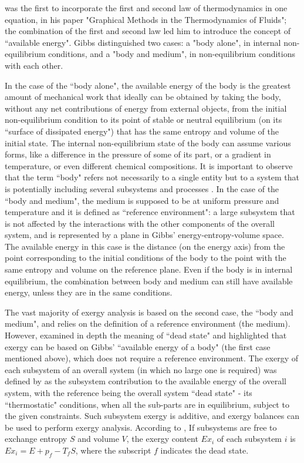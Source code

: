 \documentclass[10pt]{extarticle} %
\begin{document}
\cite{Gibbs1873} was the first to incorporate the first and second law of thermodynamics in one equation, in his paper "Graphical Methods in the Thermodyna\-mics of Fluids"; the combination of the first and second law led him to introduce the concept of ``available energy". Gibbs distinguished two cases: a "body alone", in internal non-equilibrium conditions, and a "body and medium", in non-equilibrium conditions with each other. 

In the case of the ``body alone", the available energy of the body is the greatest amount of mechanical work that ideally can be obtained by taking the body, without any net contributions of energy from external objects, from the initial non-equilibrium condition to its point of stable or neutral equilibrium (on its ``surface of dissipated energy") that has the same entropy and volume of the initial state. The internal non-equilibrium state of the body can assume various forms, like a difference in the pressure of some of its part, or a gradient in temperature, or even different chemical compositions. It is important to observe that the term ``body" refers not necessarily to a single entity but to a system that is potentially including several subsystems and processes \citep{Gaggioli2012}.
In the case of the ``body and medium", the medium is supposed to be at uniform pressure and temperature and it is defined as ``reference environment": a large subsystem that is not affected by the interactions with the other components of the overall system, and is represented by a plane in Gibbs' energy-entropy-volume space. The available energy in this case is the distance (on the energy axis) from the point corresponding to the initial conditions of the body to the point with the same entropy and volume on the reference plane. Even if the body is in internal equilibrium, the combination between body and medium can still have available energy, unless they are in the same conditions. 


The vast majority of exergy analysis is based on the second case, the  ``body and medium", and relies on the definition of a reference environment (the medium). However, \cite{Gaggioli2012} examined in depth the meaning of ``dead state" and highlighted that exergy can be based on Gibbs' ``available energy of a body" (the first case mentioned above), which does not require a reference environment. The exergy of each subsystem of an overall system (in which no large one is required) was defined by \cite{Gaggioli1998} as the subsystem contribution to the available energy of the overall system, with the reference being the overall system ``dead state" - its ``thermostatic" conditions, when all the sub-parts are in equilibrium, subject to the given constraints. Such subsystem exergy is additive, and exergy balances can be used to perform exergy analysis. According to \cite{Gaggioli2012}, If subsystems are free to exchange entropy $S$ and volume $V$, the exergy content $Ex_i$ of each subsystem $i$ is $Ex_i = E + p_f - T_fS$, where the subscript $f$ indicates the dead state.
\end{document}
